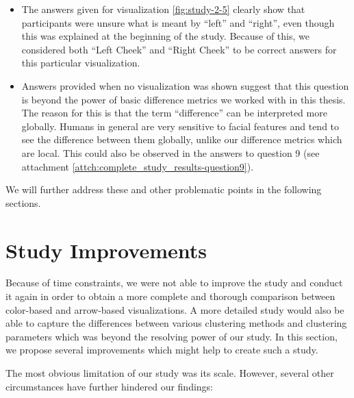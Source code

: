 
\begin{itemize}
	\item The answers given for visualization \ref{fig:study-2-5} clearly show that participants were unsure what is meant by ``left'' and ``right'', even though this was explained at the beginning of the study. Because of this, we considered both ``Left Cheek'' and ``Right Cheek'' to be correct answers for this particular visualization.
	\item Answers provided when no visualization was shown suggest that this question is beyond the power of basic difference metrics we worked with in this thesis. The reason for this is that the term ``difference'' can be interpreted more globally. Humans in general are very sensitive to facial features and tend to see the difference between them globally, unlike our difference metrics which are local. This could also be observed in the answers to question 9 (see attachment \ref{attch:complete_study_results-question9}).
\end{itemize}

We will further address these and other problematic points in the following sections.

\section{Study Improvements}
\label{sec:discussion-study_improvements}

Because of time constraints, we were not able to improve the study and conduct it again in order to obtain a more complete and thorough comparison between color-based and arrow-based visualizations. A more detailed study would also be able to capture the differences between various clustering methods and clustering parameters which was beyond the resolving power of our study. In this section, we propose several improvements which might help to create such a study.

The most obvious limitation of our study was its scale. However, several other circumstances have further hindered our findings:

